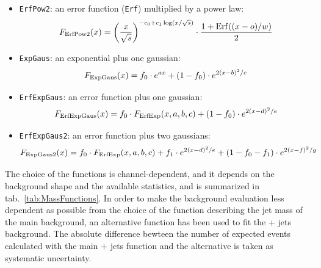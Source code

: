\begin{itemize}
  \item {\tt ErfPow2}: an error function ({\tt Erf}) multiplied by a power law: $$F_{\rm ErfPow2}(x)={ \left( \frac{x}{\sqrt{s}} \right)}^{- c_0 + c_1 \log(x/\sqrt{s})} \cdot \frac{1 + {\rm Erf}((x-o)/w)}{2}$$
  \item {\tt ExpGaus}: an exponential plus one gaussian: $$F_{\rm ExpGaus}(x) = f_0 \cdot e^{ax} + (1-f_0) \cdot e^{2(x-b)^2/c}$$
  \item {\tt ErfExpGaus}: an error function plus one gaussian: $$F_{\rm ErfExpGaus}(x) = f_0 \cdot F_{\rm ErfExp}(x,a,b,c) + (1-f_0) \cdot e^{2(x-d)^2/e}$$
  \item {\tt ErfExpGaus2}: an error function plus two gaussians: $$F_{\rm ExpGaus2}(x) = f_0 \cdot F_{\rm ErfExp}(x,a,b,c) + f_1 \cdot e^{2(x-d)^2/e} + (1-f_0-f_1) \cdot e^{2(x-f)^2/g}$$
\end{itemize}

\noindent The choice of the functions is channel-dependent, and it depends on the background shape and the available statistics, and is summarized in tab.~\ref{tab:MassFunctions}. In order to make the background evaluation less dependent as possible from the choice of the function describing the jet mass of the main background, an alternative function has been used to fit the \V + jets background. The absolute difference bewteen the number of expected events calculated with the main \V + jets function and the alternative is taken as systematic uncertainty.

